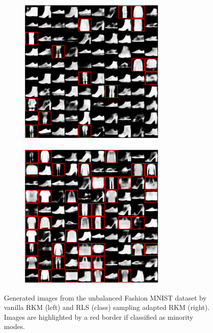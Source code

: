 \begin{figure}[H]
    \centering
    \begin{subfigure}{0.45\textwidth}
        \centering
        \includegraphics[width=0.8\textwidth]{Figures/Methods/rkm-fashion-gensamples-highlighted-minorities.png}
    \end{subfigure}
    \hfill
    \begin{subfigure}{0.45\textwidth}
        \centering
        \includegraphics[width=0.8\textwidth]{Figures/Methods/RLS-fashion-gensamples-highlighted-minorities.png}
    \end{subfigure}
    \caption{Generated images from the unbalanced Fashion MNIST dataset by vanilla RKM (left) and RLS (class) sampling adapted RKM (right). Images are highlighted by a red border if classified as minority modes.}
    \label{fig-gensamples-ubfashion-rls}
\end{figure}